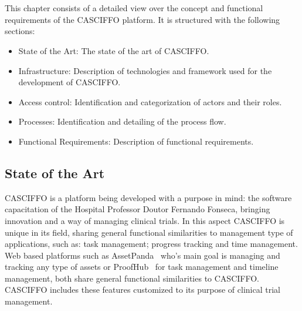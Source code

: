 \setlength{\headheight}{14.49998pt}
\chapter{}\label{ch:functionalities}

This chapter consists of a detailed view over the concept and functional requirements of the CASCIFFO platform.
It is structured with the following sections:
\begin{itemize}
    \item State of the Art: The state of the art of CASCIFFO.
    \item Infrastructure: Description of technologies and framework used for the development of CASCIFFO. 
    \item Access control: Identification and categorization of actors and their roles.
    \item Processes: Identification and detailing of the process flow.
    \item Functional Requirements: Description of functional requirements.
\end{itemize}

\section{State of the Art}
CASCIFFO is a platform being developed with a purpose in mind: the software capacitation of the Hospital Professor Doutor Fernando Fonseca, bringing innovation and a way of managing clinical trials. In this aspect CASCIFFO is unique in its field, sharing general functional similarities to management type of applications, such as: task management; progress tracking and time management. Web based platforms such as AssetPanda~\cite{asset-panda} who's main goal is managing and tracking any type of assets or ProofHub~\cite{proofhub} for task management and timeline management, both share general functional similarities to CASCIFFO.
CASCIFFO includes these features customized to its purpose of clinical trial management.

